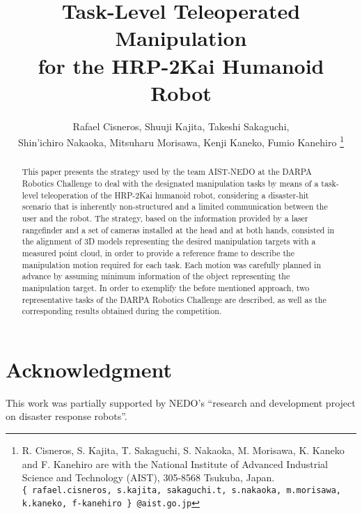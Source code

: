 \documentclass[letterpaper, 10 pt, conference]{ieeeconf}
\begin{document}
	\title{\LARGE \bf Task-Level Teleoperated Manipulation \\ for the HRP-2Kai Humanoid Robot}

	\author{Rafael Cisneros, Shuuji Kajita, Takeshi Sakaguchi, \\
					Shin'ichiro Nakaoka, Mitsuharu Morisawa, Kenji Kaneko, Fumio Kanehiro
	\thanks{R. Cisneros, S. Kajita, T. Sakaguchi, S. Nakaoka, M. Morisawa, K. Kaneko and F. Kanehiro
					are with the National Institute of Advanced Industrial Science and Technology (AIST),
					305-8568 Tsukuba, Japan.
					{\tt\scriptsize \{~rafael.cisneros, s.kajita, sakaguchi.t,
					s.nakaoka, m.morisawa, k.kaneko, f-kanehiro~\} @aist.go.jp}}}
  
	\maketitle

	\thispagestyle{empty}
	\pagestyle{empty}

	\begin{abstract}
		This paper presents the strategy used by the team AIST-NEDO at the DARPA Robotics Challenge to deal
		with the designated manipulation tasks by means of a task-level teleoperation of the HRP-2Kai humanoid robot,
		considering a disaster-hit scenario that is inherently non-structured and a limited communication between the
		user and the robot.
		The strategy, based on the information provided by a laser rangefinder and a set of cameras installed
		at the head and at both hands, consisted in the alignment of 3D models representing the desired manipulation
		targets with a measured point cloud, in order to provide a reference frame to describe the manipulation motion
		required for each task.
		Each motion was carefully planned in advance by assuming minimum information of the object representing the
		manipulation target.
		In order to exemplify the before mentioned approach, two representative tasks of the DARPA Robotics Challenge
		are described, as well as the corresponding results obtained during the competition.
	\end{abstract}

	
	
		
	
	
	
	
	
	
	
	
	
	
	
	\section*{Acknowledgment}
	
		This work was partially supported by NEDO's ``research and development project on disaster response robots''.
	
	
	
	
\end{document}
